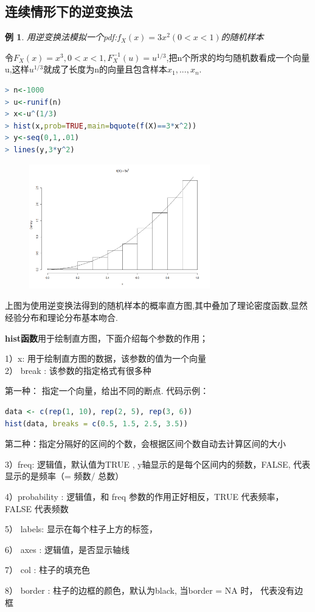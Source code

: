 \documentclass[11pt,a4paper,oneside]{book}
\newtheorem{example}{例}
\begin{document}
\subsection{连续情形下的逆变换法}
\begin{example} 用逆变换法模拟一个pdf:$f_X(x)=3x^2(0<x<1)$的随机样本
\end{example}
令$F_X(x)=x^3,0<x<1, F_X^{-1}(u)=u^{1/3}$,把n个所求的均匀随机数看成一个向量u,这样$u^{1/3}$就成了长度为n的向量且包含样本$x_1,...,x_n$.

\begin{lstlisting}[language=r]
> n<-1000
> u<-runif(n)
> x<-u^(1/3)
> hist(x,prob=TRUE,main=bquote(f(X)==3*x^2))
> y<-seq(0,1,.01)
> lines(y,3*y^2)
\end{lstlisting}
\begin{figure}[H]
	\centering
	\includegraphics[width=0.7\textwidth]{2.png}
\end{figure}
上图为使用逆变换法得到的随机样本的概率直方图,其中叠加了理论密度函数,显然经验分布和理论分布基本吻合.
\begin{tcolorbox}[colback=blue!7!white,colframe=blue!40]
\textbf{hist函数}用于绘制直方图，下面介绍每个参数的作用；

1）x: 用于绘制直方图的数据，该参数的值为一个向量\\
2） break : 该参数的指定格式有很多种

第一种： 指定一个向量，给出不同的断点. 代码示例：
\begin{lstlisting}[language=r]
data <- c(rep(1, 10), rep(2, 5), rep(3, 6))
hist(data, breaks = c(0.5, 1.5, 2.5, 3.5))	
\end{lstlisting}

第二种：指定分隔好的区间的个数，会根据区间个数自动去计算区间的大小

3）freq: 逻辑值，默认值为TRUE , y轴显示的是每个区间内的频数，FALSE, 代表显示的是频率（= 频数/ 总数）

4）probability : 逻辑值，和 freq 参数的作用正好相反，TRUE 代表频率， FALSE 代表频数

5） labels: 显示在每个柱子上方的标签，

6） axes : 逻辑值，是否显示轴线

7） col : 柱子的填充色

8） border : 柱子的边框的颜色，默认为black, 当border = NA 时， 代表没有边框
\end{tcolorbox}
\end{document}
